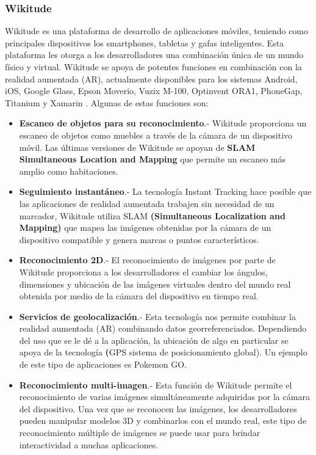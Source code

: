 \subsubsection{Wikitude}
Wikitude es una plataforma de desarrollo de aplicaciones móviles, teniendo como principales dispositivos los smartphones, tabletas y gafas inteligentes. Esta plataforma les otorga a los desarrolladores una combinación única de un mundo físico y virtual. Wikitude se apoya de potentes funciones en combinación con la realidad aumentada (AR), actualmente disponibles para los sistemas Android, iOS, Google Glass, Epson Moverio, Vuzix M-100, Optinvent ORA1, PhoneGap, Titanium y Xamarin \cite{B09}. Algunas de estas funciones son:
\begin{itemize}
	\item \textbf{Escaneo de objetos para su reconocimiento}.- Wikitude proporciona un escaneo de objetos como muebles a través de la cámara de un dispositivo móvil. Las últimas versiones de Wikitude se apoyan de \textbf{SLAM Simultaneous Location and Mapping} que permite un escaneo más amplio como habitaciones. 
	
	\item \textbf{Seguimiento instantáneo}.- La tecnología Instant Tracking hace posible que las aplicaciones de realidad aumentada trabajen sin necesidad de un marcador, Wikitude utiliza SLAM \textbf{(Simultaneous Localization and Mapping) }que mapea las imágenes obtenidas por la cámara de un dispositivo compatible y genera marcas o puntos característicos.
	
	\item \textbf{Reconocimiento 2D}.- El reconocimiento de imágenes por parte de Wikitude proporciona a los desarrolladores el cambiar los ángulos, dimensiones y ubicación de las imágenes virtuales dentro del mundo real obtenida por medio de la cámara del dispositivo en tiempo real.
	
	\item \textbf{Servicios de geolocalización}.- Esta tecnología nos permite combinar la realidad aumentada (AR) combinando datos georreferenciados. Dependiendo del uso que se le dé a la aplicación, la ubicación de algo en particular se apoya de la tecnología \textbf(GPS sistema de posicionamiento global). Un ejemplo de este tipo de aplicaciones es Pokemon GO. 
	
	\item \textbf{Reconocimiento multi-imagen}.- Esta función de Wikitude permite el reconocimiento de varias imágenes simultáneamente adquiridas por la cámara del dispositivo. Una vez que se reconocen las imágenes, los desarrolladores pueden manipular modelos 3D y combinarlos con el mundo real, este tipo de reconocimiento múltiple de imágenes se puede usar para brindar interactividad a muchas aplicaciones.
	

\end{itemize}
